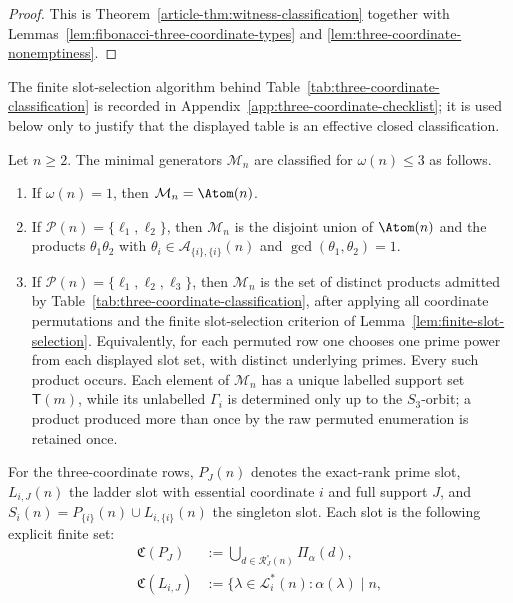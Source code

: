 \begin{proof}
This is Theorem~\ref{article-thm:witness-classification} together with
Lemmas~\ref{lem:fibonacci-three-coordinate-types} and
\ref{lem:three-coordinate-nonemptiness}.
\end{proof}

The finite slot-selection algorithm behind Table~\ref{tab:three-coordinate-classification}
is recorded in Appendix~\ref{app:three-coordinate-checklist}; it is used below
only to justify that the displayed table is an effective closed classification.

\begin{theorem}
\label{thm:low-support-classification-package}
Let $n\ge2$.  The minimal generators $\mathcal M_n$ are classified for
$\omega(n)\le3$ as follows.
\begin{enumerate}[label=(\roman*)]
\item If $\omega(n)=1$, then $\mathcal M_n=\Atom(n)$.
\item If $\mathcal P(n)=\{\ell_1,\ell_2\}$, then $\mathcal M_n$ is the
 disjoint union of $\Atom(n)$ and the products
 $\theta_1\theta_2$ with
 $\theta_i\in\mathcal A_{\{i\},\{i\}}(n)$ and
 $\gcd(\theta_1,\theta_2)=1$.
\item If $\mathcal P(n)=\{\ell_1,\ell_2,\ell_3\}$, then $\mathcal M_n$ is the
 set of distinct products admitted by Table~\ref{tab:three-coordinate-classification},
 after applying all coordinate permutations and the finite slot-selection
 criterion of Lemma~\ref{lem:finite-slot-selection}.  Equivalently, for each
 permuted row one chooses one prime power from each displayed slot set, with
 distinct underlying primes. Every such product occurs. Each element of
 $\mathcal M_n$ has a unique labelled support set $\mathsf T(m)$, while its
 unlabelled $\Gamma_i$ is determined only up to the $S_3$-orbit; a product
 produced more than once by the raw permuted enumeration is retained once.
\end{enumerate}
For the three-coordinate rows,
$P_J(n)$ denotes the exact-rank prime slot, $L_{i,J}(n)$ the ladder slot with
essential coordinate $i$ and full support $J$, and
$S_i(n)=P_{\{i\}}(n)\cup L_{i,\{i\}}(n)$ the singleton slot.  Each slot is the
following explicit finite set:
\[
\begin{aligned}
\mathfrak C(P_J)&:=\bigcup_{d\in\mathcal R_J^\circ(n)}\Pi_\alpha(d),\\
\mathfrak C(L_{i,J})&:=\{\lambda\in\mathcal L_i^*(n):\alpha(\lambda)\mid n,

\end{aligned}\]
\end{theorem}
